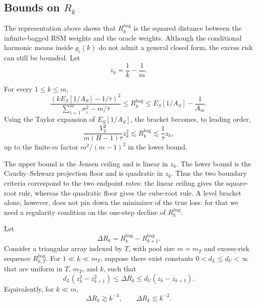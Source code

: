 

\subsection{Bounds on $R_k$}
\label{sec:rk_bounds}

The representation above shows that $R_k^{\mathrm{bag}}$ is the squared
distance between the infinite-bagged RSM weights and the oracle weights.
Although the conditional harmonic means inside $g_i(k)$ do not admit a
general closed form, the excess risk can still be bounded.  Let
\[
  z_k=\frac{1}{k}-\frac{1}{m}.
\]

\begin{proposition}
\label{prop:exact_bracket}
For every $1\le k\le m$,
\[
  \frac{
    \left(kE_S[1/A_S]-1/\bar\tau\right)^2
  }{
    \sum_{i=1}^m\sigma_i^2-m/\bar\tau
  }
  \le
  R_k^{\mathrm{bag}}
  \le
  E_S[1/A_S]-\frac{1}{A_m}.
\]
Using the Taylor expansion of $E_S[1/A_S]$, the bracket becomes, to leading
order,
\[
  \frac{V_\delta^2}{m(H-1)\bar\tau}z_k^2
  \lesssim
  R_k^{\mathrm{bag}}
  \lesssim
  \frac{1}{\bar\tau}z_k,
\]
up to the finite-$m$ factor $m^2/(m-1)^2$ in the lower bound.
\end{proposition}

\noindent
The upper bound is the Jensen ceiling and is linear in $z_k$.  The lower
bound is the Cauchy--Schwarz projection floor and is quadratic in $z_k$.
Thus the two boundary criteria correspond to the two endpoint rates:
the linear ceiling gives the square-root rule, whereas the quadratic floor
gives the cube-root rule.  A level bracket alone, however, does not pin down
the minimizer of the true loss: for that we need a regularity condition on
the one-step decline of $R_k^{\mathrm{bag}}$.

\begin{assumption}
\label{ass:marginal_regular}
Let
\[
  \Delta R_k=R_k^{\mathrm{bag}}-R_{k+1}^{\mathrm{bag}}.
\]
Consider a triangular array indexed by $T$, with pool size $m=m_T$ and
excess-risk sequence $R_{k,T}^{\mathrm{bag}}$.  For $1\ll k\ll m_T$,
suppose there exist constants $0<d_L\le d_U<\infty$ that are uniform in
$T$, $m_T$, and $k$, such that
\[
  d_L\left(z_k^2-z_{k+1}^2\right)
  \le
  \Delta R_k
  \le
  d_U\left(z_k-z_{k+1}\right).
\]
Equivalently, for $k\ll m$,
\[
  \Delta R_k\gtrsim k^{-3},
  \qquad
  \Delta R_k\lesssim k^{-2}.
\]
\end{assumption}

